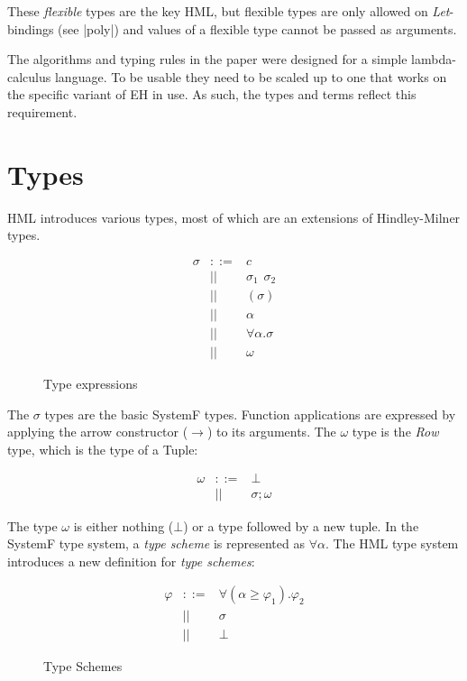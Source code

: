 These \textit{flexible} types are the key HML, but flexible types are only allowed on \textit{Let}-bindings (see |poly|) and values of a flexible type cannot be passed as arguments.

The algorithms and typing rules in the paper were designed for a simple lambda-calculus language. To be usable they need to be scaled up to one that works on the specific variant of EH in use. As such, the types and terms reflect this requirement.
\section{Types}
\label{sec:Types}
HML introduces various types, most of which are an extensions of Hindley-Milner types. 

\begin{figure}[H]
\begin{eqnarray*}
\sigma & ::= & c \\ 
       & || & \sigma_1 \hspace{5pt} \sigma_2 \\
       & || & (\sigma) \\ 
       & || & \alpha \\ 
       & || & \forall \alpha . \sigma \\
       & || & \omega
\end{eqnarray*}
\caption{Type expressions}
\label{types}
\end{figure}

The $\sigma$ types are the basic SystemF types. Function applications are expressed by applying the arrow constructor ($\rightarrow$) to its arguments. The $\omega$ type is the \emph{Row} type, which is the type of a Tuple:

\begin{eqnarray*}
\omega & ::= & \bot \\
       & || & \sigma ; \omega
\end{eqnarray*}

The type $\omega$ is either nothing ($\bot$) or a type followed by a new tuple.
In the SystemF type system, a \emph{type scheme} is represented as $\forall \alpha$. The HML type system introduces a new definition for \emph{type schemes}:

\begin{figure}[H]
\begin{eqnarray*}
\varphi & ::= & \forall (\alpha \geq \varphi_1). \varphi_2 \\
        & || & \sigma \\
        & || & \bot
\end{eqnarray*}
\caption{Type Schemes}
\label{type-schemes}
\end{figure}

